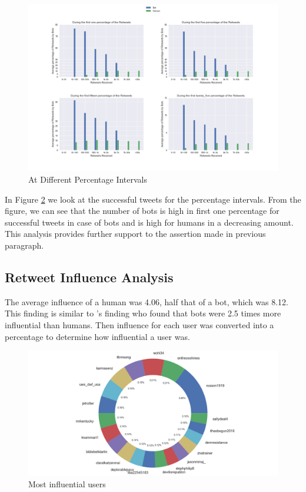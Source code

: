 \documentclass[letterpaper]{article}
\begin{document}
\begin{figure}
    \includegraphics[width=\linewidth]{images/bot_humans_retweet_percentages.png}
    \caption{At Different Percentage Intervals}
    \label{fig:humans_bots_percentage}
\end{figure}

In Figure \ref{fig:humans_bots_percentage} we look at the successful tweets for the percentage intervals.
From the figure, we can see that the number of bots is high in first one percentage for successful tweets in case of bots and is high for humans in a decreasing amount.
This analysis provides further support to the assertion made in previous paragraph.

\subsection{Retweet Influence Analysis}

The average influence of a human was 4.06, half that of a bot, which was 8.12. This finding is similar to 
\cite{rizoiu2018debatenight}'s finding who found that bots were 2.5 times more influential than humans. Then influence for each user was converted 
into a percentage to determine how influential a user was. 

\begin{figure}[h!]
    \includegraphics[width=\linewidth]{images/top_influences.png}
    \caption{Most influential users}
    \label{fig:humans_bots_percentage}
\end{figure}
\end{document}
